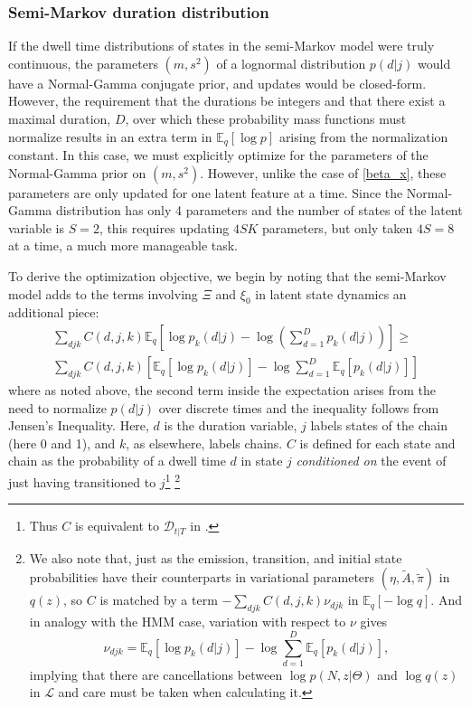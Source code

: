 \documentclass[10pt,letterpaper]{article}
\begin{document}
\subsubsection{Semi-Markov duration distribution}
If the dwell time distributions of states in the semi-Markov model were truly continuous, the parameters $(m, s^2)$ of a lognormal distribution $p(d|j)$ would have a Normal-Gamma conjugate prior, and updates would be closed-form. However, the requirement that the durations be integers and that there exist a maximal duration, $D$, over which these probability mass functions must normalize results in an extra term in $\mathbb{E}_q[\log p]$ arising from the normalization constant. In this case, we must explicitly optimize for the parameters of the Normal-Gamma prior on $(m, s^2)$. However, unlike the case of \ref{beta_x}, these parameters are only updated for one latent feature at a time. Since the Normal-Gamma distribution has only 4 parameters and the number of states of the latent variable is $S = 2$, this requires updating $4SK$ parameters, but only taken $4S = 8$ at a time, a much more manageable task.

To derive the optimization objective, we begin by noting that the semi-Markov model adds to the terms involving $\Xi$ and $\xi_0$ in latent state dynamics an additional piece:
\begin{multline}
    \sum_{d j k} C(d, j, k) \mathbb{E}_q \left[\log p_k(d|j) - \log \left(\sum_{d=1}^D p_k(d|j) \right) \right] \ge \\
    \sum_{d j k} C(d, j, k) \left[\mathbb{E}_q \left[\log p_k(d|j)\right] - \log \sum_{d=1}^D \mathbb{E}_q\left[p_k(d|j) \right] \right]
\end{multline}
where as noted above, the second term inside the expectation arises from the need to normalize $p(d|j)$ over discrete times and the inequality follows from Jensen's Inequality. Here, $d$ is the duration variable, $j$ labels states of the chain (here 0 and 1), and $k$, as elsewhere, labels chains\cite{Mitchell1993-sl,Mitchell1995-go,Yu2006-bb}. $C$ is defined for each state and chain as the probability of a dwell time $d$ in state $j$ \emph{conditioned on} the event of just having transitioned to $j$\footnote{Thus $C$ is equivalent to $\mathcal{D}_{t|T}$ in \cite{Yu2006-bb}.}
\footnote{
We also note that, just as the emission, transition, and initial state probabilities have their counterparts in variational parameters $(\eta, \tilde{A}, \tilde{\pi})$ in $q(z)$, so $C$ is matched by a term $-\sum_{djk} C(d, j, k) \nu_{djk}$ in $\mathbb{E}_q[-\log q]$. And in analogy with the HMM case, variation with respect to $\nu$ gives
\begin{equation}
    \nu_{djk} = \mathbb{E}_q \left[\log p_k(d|j)\right] - \log \sum_{d=1}^D \mathbb{E}_q\left[p_k(d|j) \right],
\end{equation}
implying that there are cancellations between $\log p(N, z|\Theta)$ and $\log q(z)$ in $\mathcal{L}$ and care must be taken when calculating it\cite{beal2003variational}.}
\end{document}
